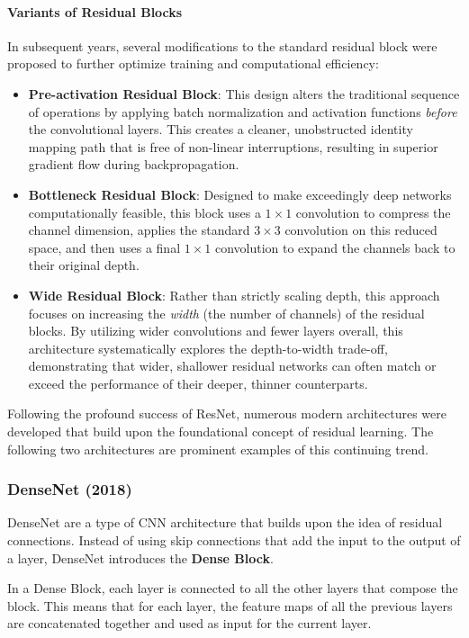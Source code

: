 \paragraph{Variants of Residual Blocks} 
In subsequent years, several modifications to the standard residual block were proposed to further optimize training and computational efficiency:
\begin{itemize}
    \item \textbf{Pre-activation Residual Block}: This design alters the traditional sequence of operations by applying batch normalization and activation functions \textit{before} the convolutional layers. This creates a cleaner, unobstructed identity mapping path that is free of non-linear interruptions, resulting in superior gradient flow during backpropagation.
    \item \textbf{Bottleneck Residual Block}: Designed to make exceedingly deep networks computationally feasible, this block uses a $1 \times 1$ convolution to compress the channel dimension, applies the standard $3 \times 3$ convolution on this reduced space, and then uses a final $1 \times 1$ convolution to expand the channels back to their original depth.
    \item \textbf{Wide Residual Block}: Rather than strictly scaling depth, this approach focuses on increasing the \textit{width} (the number of channels) of the residual blocks. By utilizing wider convolutions and fewer layers overall, this architecture systematically explores the depth-to-width trade-off, demonstrating that wider, shallower residual networks can often match or exceed the performance of their deeper, thinner counterparts.
\end{itemize}

Following the profound success of ResNet, numerous modern architectures were developed that build upon the foundational concept of residual learning. The following two architectures are prominent examples of this continuing trend.

\subsubsection{DenseNet (2018)}
DenseNet are a type of CNN architecture that builds upon the idea of residual connections. 
Instead of using skip connections that add the input to the output of a layer, DenseNet introduces the \textbf{Dense Block}. 

In a Dense Block, each layer is connected to all the other layers that compose the block. This means that for each layer, the feature maps of
all the previous layers are concatenated together and used as input for the current layer.

